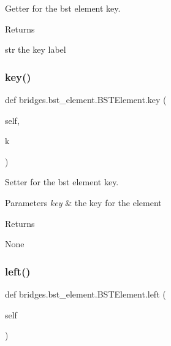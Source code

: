 Getter for the bst element key. 

\begin{DoxyReturn}{Returns}


str the key label 
\end{DoxyReturn}
\mbox{\label{classbridges_1_1bst__element_1_1_b_s_t_element_a46236bc9db305c61429a56f7ed74df64}} 
\subsubsection{\texorpdfstring{key()}{key()}\hspace{0.1cm}{\footnotesize\ttfamily [2/2]}}
{\footnotesize\ttfamily def bridges.\+bst\+\_\+element.\+B\+S\+T\+Element.\+key (\begin{DoxyParamCaption}\item[{}]{self,  }\item[{}]{k }\end{DoxyParamCaption})}



Setter for the bst element key. 


\begin{DoxyParams}{Parameters}
{\em key} & the key for the element \\
\hline
\end{DoxyParams}
\begin{DoxyReturn}{Returns}


None 
\end{DoxyReturn}
\mbox{\label{classbridges_1_1bst__element_1_1_b_s_t_element_adb40ae0f98fe1cb7f153494c544d3f9f}} 
\subsubsection{\texorpdfstring{left()}{left()}\hspace{0.1cm}{\footnotesize\ttfamily [1/2]}}
{\footnotesize\ttfamily def bridges.\+bst\+\_\+element.\+B\+S\+T\+Element.\+left (\begin{DoxyParamCaption}\item[{}]{self }\end{DoxyParamCaption})}



